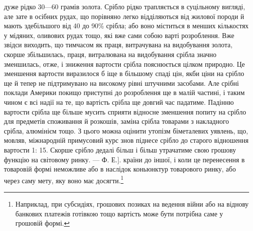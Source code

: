 дуже рідко 30—60 грамів золота. Срібло рідко трапляється в суцільному
вигляді, але зате в осібних рудах, що порівняно легко відділяються від жилової
породи й мають здебільшого від 40 до 90\% срібла; або воно міститься
в менших кількостях у мідяних, оливових рудах тощо, які вже сами собою
варті розроблення. Вже звідси виходить, що тимчасом як праця,
витрачувана на видобування золота, скорше збільшилась, праця, витралювана
на видобування срібла значно зменшилась, отже, і зниження
вартости срібла пояснюється цілком природно. Це зменшення вартости
виразилося б іще в більшому спаді цін, якби ціни на срібло ще й тепер
не підтримувано на високому рівні штучними засобами. Але срібні поклади
Америки покищо приступні до розроблення ще в малій частині, і таким
чином є всі надії на те, що вартість срібла ще довгий час падатиме. Падінню
вартости срібла ще більше мусить сприяти відносне зменшення попиту
на срібло для предметів споживання й розкошів, заміна срібла товарами
з накладного срібла, алюмінієм тощо. З цього можна оцінити утопізм
біметалевих уявлень, що, мовляв, міжнародній примусовий курс
знов піднесе срібло до старого відношення вартости 1: 15. Скорше
срібло дедалі більш і більш утрачатиме свою грошову функцію на світовому
ринку. — Ф. Е.].
країни до іншої, і коли це перенесення в товаровій формі неможливе
або в наслідок коньюнктур товарового ринку, або через
саму мету, яку воно має досягти.\footnote{
Наприклад, при субсидіях, грошових позиках на ведення війни
або на віднову банкових платежів готівкою тощо вартість може бути потрібна
саме у грошовій формі.
}

